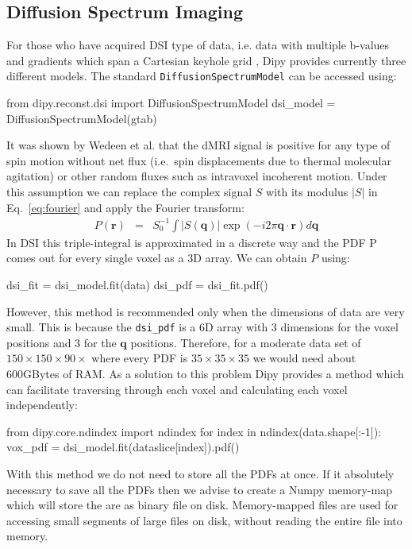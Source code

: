 \documentclass{bioinfo}
\begin{document}
\subsection{Diffusion Spectrum Imaging}\label{dsi}

For those who have acquired DSI type of data, i.e. data with multiple b-values and gradients which span a Cartesian keyhole grid \citep{tuch:02, wedeen-hagmann-etal:05, Garyfallidis_thesis}, Dipy provides currently three different models. The standard \texttt{DiffusionSpectrumModel} can be accessed using:
\begin{python}
from dipy.reconst.dsi import DiffusionSpectrumModel
dsi_model = DiffusionSpectrumModel(gtab)
\end{python}
It was shown by Wedeen et al. \citep{wedeen-hagmann-etal:05} that the dMRI signal is positive for any type of spin motion without net flux (i.e.~spin displacements due to thermal molecular agitation) or other random fluxes such as intravoxel incoherent motion. Under this assumption we can replace the complex signal $S$ with its modulus $|S|$ in Eq.~\ref{eq:fourier} and apply the Fourier transform:
\begin{eqnarray}
P(\mathbf{r}) & = & S_{0}^{-1}\int|S(\mathbf{q})|\exp(-i2\pi\mathbf{q}\cdot\mathbf{r})d\mathbf{q}\label{eq:P_modulus}
\end{eqnarray}
In DSI this triple-integral is approximated in a discrete way and the PDF P comes out for every single voxel as a 3D array. We can obtain $P$ using:
\begin{python}
dsi_fit = dsi_model.fit(data)
dsi_pdf = dsi_fit.pdf()
\end{python}
However, this method is recommended only when the dimensions of data are very small. This is because the \texttt{dsi\_pdf} is a 6D array with 3 dimensions for the voxel positions and 3 for the $\mathbf{q}$ positions. Therefore, for a moderate data set of $150\times150\times90\times$ where every PDF is $35\times35\times35$ we would need about 600GBytes of RAM. As a solution to this problem Dipy provides a method which can facilitate traversing through each voxel and calculating each voxel independently:
\begin{python}
from dipy.core.ndindex import ndindex
for index in ndindex(data.shape[:-1]):
    vox_pdf = dsi_model.fit(dataslice[index]).pdf()
\end{python}
With this method we do not need to store all the PDFs at once. If it absolutely necessary to save all the PDFs then we advise to create a Numpy memory-map which will store the are as binary file on disk. Memory-mapped files are used for accessing small segments of large files on disk, without reading the entire file into memory.
\end{document}
